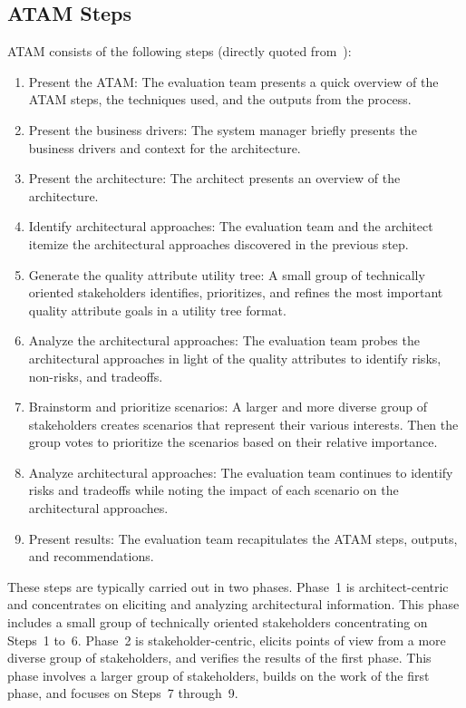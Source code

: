 \subsection{ATAM Steps}
\label{subsec:atamsteps}
ATAM consists of the following steps (directly quoted from~\cite{Bianco2007EvaluatingArchitecture}):
\begin{enumerate}
    \item Present the ATAM: The evaluation team presents a quick overview of the ATAM steps, the techniques used, and the outputs from the process. 
    \item Present the business drivers: The system manager briefly presents the business drivers and context for the architecture.
    \item Present the architecture: The architect presents an overview of the architecture.
    \item Identify architectural approaches: The evaluation team and the architect itemize the architectural approaches discovered in the previous step. 
    \item Generate the quality attribute utility tree: A small group of technically oriented stakeholders identifies, prioritizes, and refines the most important quality attribute goals in a utility tree format.
    \item Analyze the architectural approaches: The evaluation team probes the architectural approaches in light of the quality attributes to identify risks, non-risks, and tradeoffs. 
    \item Brainstorm and prioritize scenarios: A larger and more diverse group of stakeholders creates scenarios that represent their various interests. Then the group votes to prioritize the scenarios based on their relative importance. 
    \item Analyze architectural approaches: The evaluation team continues to identify risks and tradeoffs while noting the impact of each scenario on the architectural approaches. 
    \item Present results: The evaluation team recapitulates the ATAM steps, outputs, and recommendations.
\end{enumerate}

These steps are typically carried out in two phases. Phase~1 is architect-centric and concentrates on eliciting and analyzing architectural information. This phase includes a small group of technically oriented stakeholders concentrating on Steps~1 to~6. Phase~2 is stakeholder-centric, elicits points of view from a more diverse group of stakeholders, and verifies the results of the first phase. This phase involves a larger group of stakeholders, builds on the work of the first phase, and focuses on Steps~7 through~9.~\cite{Jones2001EvaluateStudy} 

